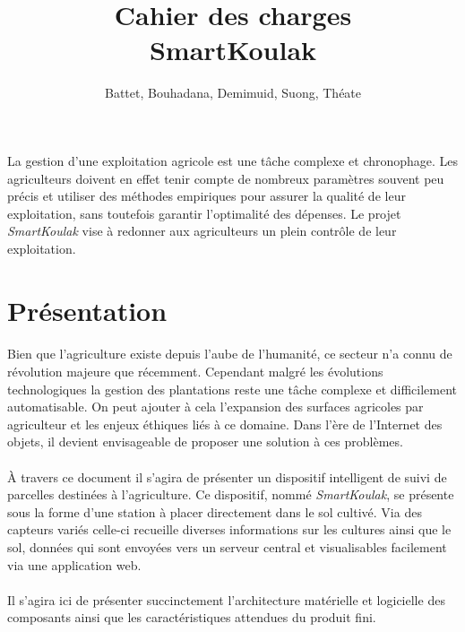 \documentclass[11pt,a4paper]{article}
\author{Battet, Bouhadana, Demimuid, Suong, Théate}
\title{Cahier des charges \\
\textbf {SmartKoulak}}
\begin{document}
\maketitle

\paragraph{}La gestion d'une exploitation agricole est une tâche complexe et chronophage. Les agriculteurs doivent en effet tenir compte de nombreux paramètres souvent peu précis et utiliser des méthodes empiriques pour assurer la qualité de leur exploitation, sans toutefois garantir l'optimalité des dépenses. Le projet \textit{SmartKoulak} vise à redonner aux agriculteurs un plein contrôle de leur exploitation.


\section{Présentation}
\paragraph{}Bien que l’agriculture existe depuis l’aube de l’humanité, ce secteur n’a connu de révolution majeure que récemment. Cependant malgré les évolutions technologiques la gestion des plantations reste une tâche complexe et difficilement automatisable. On peut ajouter à cela l'expansion des surfaces agricoles par agriculteur et les enjeux éthiques liés à ce domaine. Dans l’ère de l’Internet des objets, il devient envisageable de proposer une solution à ces problèmes.

\paragraph{}À travers ce document il s’agira de présenter un dispositif intelligent de suivi de parcelles destinées à l’agriculture. Ce dispositif, nommé \textit{SmartKoulak}, se présente sous la forme d’une station à placer directement dans le sol cultivé. Via des capteurs variés celle-ci recueille diverses informations sur les cultures ainsi que le sol, données qui sont envoyées vers un serveur central et visualisables facilement via une application web.

\paragraph{}Il s’agira ici de présenter succinctement l’architecture matérielle et logicielle des composants ainsi que les caractéristiques attendues du produit fini.
\end{document}
